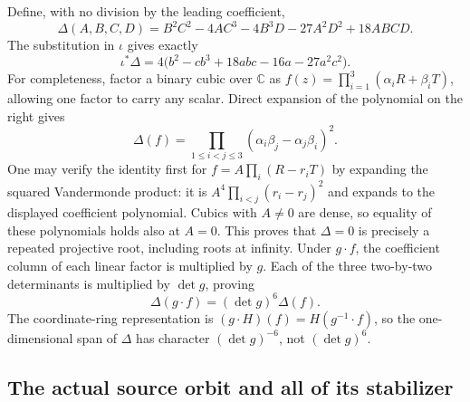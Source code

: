 Define, with no division by the leading coefficient,
\[
 \Delta(A,B,C,D)=B^2C^2-4AC^3-4B^3D-27A^2D^2+18ABCD.
\]
The substitution in $\iota$ gives exactly
\begin{equation}\label{eq:invariant-disc}
 \iota^*\Delta
 =4\bigl(b^2-cb^3+18abc-16a-27a^2c^2\bigr).
\end{equation}
For completeness, factor a binary cubic over $\mathbb C$ as
$f(z)=\prod_{i=1}^3(\alpha_iR+\beta_iT)$, allowing one factor to
carry any scalar. Direct expansion of the polynomial on the right
gives
\[
 \Delta(f)=\prod_{1\le i<j\le3}
              (\alpha_i\beta_j-\alpha_j\beta_i)^2.
\]
One may verify the identity first for
$f=A\prod_i(R-r_iT)$ by expanding the squared Vandermonde product:
it is $A^4\prod_{i<j}(r_i-r_j)^2$ and expands to the displayed
coefficient polynomial. Cubics with $A\ne0$ are dense, so equality
of these polynomials holds also at $A=0$. This proves that $\Delta=0$
is precisely a repeated projective root, including roots at infinity.
Under $g\cdot f$, the coefficient column of each linear factor is
multiplied by $g$. Each of the three two-by-two determinants is
multiplied by $\det g$, proving
\begin{equation}\label{eq:invariant-disc-weight}
 \Delta(g\cdot f)=(\det g)^6\Delta(f).
\end{equation}
The coordinate-ring representation is
$(g\cdot H)(f)=H(g^{-1}\cdot f)$, so the one-dimensional span of
$\Delta$ has character $(\det g)^{-6}$, not $(\det g)^6$.

\subsection{The actual source orbit and all of its stabilizer}

